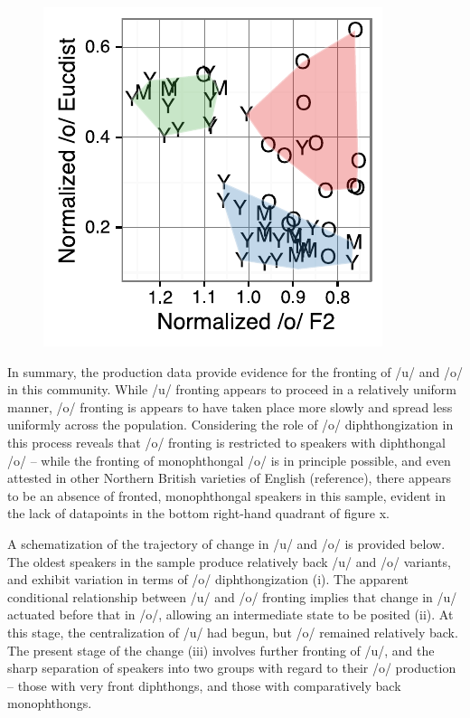 \documentclass[PWPL]{article}
\begin{document}
\begin{figure}[ht]
\centering
\includegraphics[scale=0.7]{ow_front_dip_small.pdf}
\end{figure}

In summary, the production data provide evidence for the fronting of /u/ and /o/ in this community. While /u/ fronting appears to proceed in a relatively uniform manner, /o/ fronting is appears to have taken place more slowly and spread less uniformly across the population. Considering the role of /o/ diphthongization in this process reveals that /o/ fronting is restricted to speakers with diphthongal /o/ -- while the fronting of monophthongal /o/ is in principle possible, and even attested in other Northern British varieties of English (reference), there appears to be an absence of fronted, monophthongal speakers in this sample, evident in the lack of datapoints in the bottom right-hand quadrant of figure x.

A schematization of the trajectory of change in /u/ and /o/ is provided below. The oldest speakers in the sample produce relatively back /u/ and /o/ variants, and exhibit variation in terms of /o/ diphthongization (i). The apparent conditional relationship between /u/ and /o/ fronting implies that change in /u/ actuated before that in /o/, allowing an intermediate state to be posited (ii). At this stage, the centralization of /u/ had begun, but /o/ remained relatively back. The present stage of the change (iii) involves further fronting of /u/, and the sharp separation of speakers into two groups with regard to their /o/ production -- those with very front diphthongs, and those with comparatively back monophthongs. 
\end{document}
